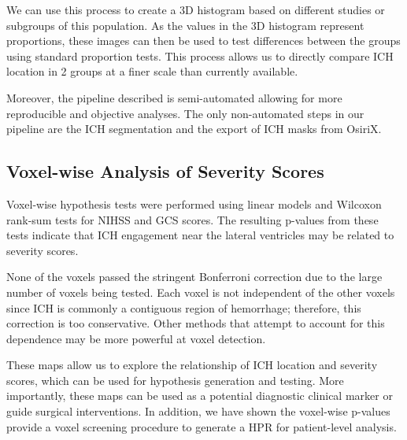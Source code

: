 \documentclass[10pt]{article}\usepackage[]{graphicx}\usepackage[]{color}
\begin{document}
We can use this process to create a 3D histogram based on different studies or subgroups of this population.  As the values in the 3D histogram represent proportions, these images can then be used to test differences between the groups using standard proportion tests.  This process allows us to directly compare ICH location in 2 groups at a finer scale than currently available.

Moreover, the pipeline described is semi-automated allowing for more reproducible and objective analyses.  The only non-automated steps in our pipeline are the ICH segmentation and the export of ICH masks from OsiriX.  





 



\subsection{Voxel-wise Analysis of Severity Scores}

Voxel-wise hypothesis tests were performed using linear models and Wilcoxon rank-sum tests for NIHSS and GCS scores.  The resulting p-values from these tests indicate that ICH engagement near the lateral ventricles may be related to severity scores.  

None of the voxels passed the stringent Bonferroni correction due to the large number of voxels being tested. Each voxel is not independent of the other voxels since ICH is commonly a contiguous region of hemorrhage; therefore, this correction is too conservative.  Other methods that attempt to account for this dependence may be more powerful at voxel detection.  

These maps allow us to explore the relationship of ICH location and severity scores, which can be used for hypothesis generation and testing.  More importantly, these maps can be used as a potential diagnostic clinical marker or guide surgical interventions.  In addition, we have shown the voxel-wise p-values provide a voxel screening procedure to generate a HPR for patient-level analysis.  
\end{document}
